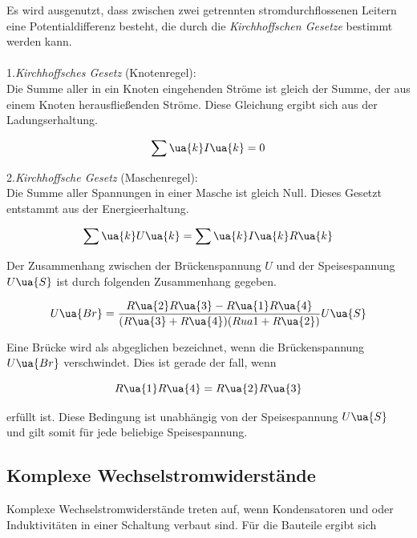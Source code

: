 Es wird ausgenutzt, dass zwischen zwei getrennten stromdurchflossenen
Leitern eine Potentialdifferenz besteht, die durch die \emph{Kirchhoffschen Gesetze}
bestimmt werden kann.\\\\

1.\emph{Kirchhoffsches Gesetz} (Knotenregel):\\
Die Summe aller in ein Knoten eingehenden Ströme ist gleich der Summe, der aus
einem Knoten herausfließenden Ströme. Diese Gleichung ergibt sich aus der
Ladungserhaltung.

\begin{equation}
  \label{eqn:Kirchhoff1}
  \sum\ua{k} I\ua{k} = 0
\end{equation}

2.\emph{Kirchhoffsche Gesetz} (Maschenregel):\\
Die Summe aller Spannungen in einer Masche ist gleich Null.
Dieses Gesetzt entstammt aus der Energieerhaltung.

\begin{equation}
  \label{eqn:Krichhoff2}
  \sum\ua{k}U\ua{k} = \sum\ua{k}I\ua{k}R\ua{k}
\end{equation}

Der Zusammenhang zwischen der Brückenspannung $U$ und der Speisespannung $U\ua{S}$
ist durch folgenden Zusammenhang gegeben.

\begin{equation}
  \label{eqn:BrückenUndSpeisespannung}
  U\ua{Br} = \frac{R\ua{2}R\ua{3} - R\ua{1}R\ua{4}}{(R\ua{3} + R\ua{4})(Rua{1} + R\ua{2})}U\ua{S}
\end{equation}

Eine Brücke wird als abgeglichen bezeichnet, wenn die Brückenspannung $U\ua{Br}$ verschwindet.
Dies ist gerade der fall, wenn

\begin{equation}
  \label{eqn:abgleichbed}
  R\ua{1}R\ua{4} = R\ua{2}R\ua{3}
\end{equation}

erfüllt ist.
Diese Bedingung ist unabhängig von der Speisespannung $U\ua{S}$
und gilt somit für jede beliebige Speisespannung.

\subsection{Komplexe Wechselstromwiderstände}

Komplexe Wechselstromwiderstände treten auf, wenn Kondensatoren und oder Induktivitäten
in einer Schaltung verbaut sind. Für die Bauteile ergibt sich

